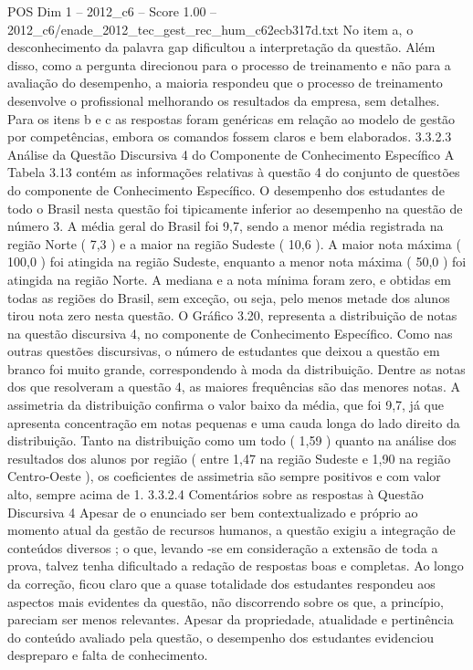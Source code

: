 \begin{textsample}{POS Dim 1 – 2012\_c6 – Score 1.00 – 2012\_c6/enade\_2012\_tec\_gest\_rec\_hum\_c62ecb317d.txt}
No item a, o desconhecimento da palavra gap dificultou a interpretação da questão.
Além disso, como a pergunta direcionou para o processo de treinamento e não para a avaliação do desempenho, a maioria respondeu que o processo de treinamento desenvolve o profissional melhorando os resultados da empresa, sem detalhes.
Para os itens b e c as respostas foram genéricas em relação ao modelo de gestão por competências, embora os comandos fossem claros e bem elaborados. 3.3.2.3 Análise da Questão Discursiva 4 do Componente de Conhecimento Específico A Tabela 3.13 contém as informações relativas à questão 4 do conjunto de questões do componente de Conhecimento Específico.
O desempenho dos estudantes de todo o Brasil nesta questão foi tipicamente inferior ao desempenho na questão de número 3.
A média geral do Brasil foi 9,7, sendo a menor média registrada na região Norte ( 7,3 ) e a maior na região Sudeste ( 10,6 ).
A maior nota máxima ( 100,0 ) foi atingida na região Sudeste, enquanto a menor nota máxima ( 50,0 ) foi atingida na região Norte.
A mediana e a nota mínima foram zero, e obtidas em todas as regiões do Brasil, sem exceção, ou seja, pelo menos metade dos alunos tirou nota zero nesta questão.
O Gráfico 3.20, representa a distribuição de notas na questão discursiva 4, no componente de Conhecimento Específico.
Como nas outras questões discursivas, o número de estudantes que deixou a questão em branco foi muito grande, correspondendo à moda da distribuição.
Dentre as notas dos que resolveram a questão 4, as maiores frequências são das menores notas.
A assimetria da distribuição confirma o valor baixo da média, que foi 9,7, já que apresenta concentração em notas pequenas e uma cauda longa do lado direito da distribuição.
Tanto na distribuição como um todo ( 1,59 ) quanto na análise dos resultados dos alunos por região ( entre 1,47 na região Sudeste e 1,90 na região Centro-Oeste ), os coeficientes de assimetria são sempre positivos e com valor alto, sempre acima de 1. 3.3.2.4 Comentários sobre as respostas à Questão Discursiva 4 Apesar de o enunciado ser bem contextualizado e próprio ao momento atual da gestão de recursos humanos, a questão exigiu a integração de conteúdos diversos ; o que, levando -se em consideração a extensão de toda a prova, talvez tenha dificultado a redação de respostas boas e completas.
Ao longo da correção, ficou claro que a quase totalidade dos estudantes respondeu aos aspectos mais evidentes da questão, não discorrendo sobre os que, a princípio, pareciam ser menos relevantes.
Apesar da propriedade, atualidade e pertinência do conteúdo avaliado pela questão, o desempenho dos estudantes evidenciou despreparo e falta de conhecimento.

\end{textsample}

